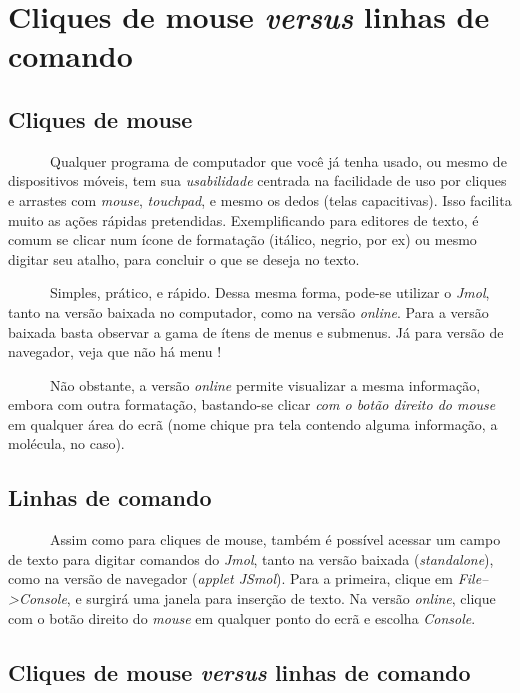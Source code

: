 \documentclass[
  letterpaper,
  DIV=11,
  numbers=noendperiod]{scrreprt}
\begin{document}

\chapter{\texorpdfstring{Cliques de mouse \emph{versus} linhas de
comando}{Cliques de mouse versus linhas de comando}}\label{cliques-de-mouse-versus-linhas-de-comando}

\section{Cliques de mouse}\label{cliques-de-mouse}

~~~~~~Qualquer programa de computador que você já tenha usado, ou mesmo
de dispositivos móveis, tem sua \emph{usabilidade} centrada na
facilidade de uso por cliques e arrastes com \emph{mouse},
\emph{touchpad}, e mesmo os dedos (telas capacitivas). Isso facilita
muito as ações rápidas pretendidas. Exemplificando para editores de
texto, é comum se clicar num ícone de formatação (itálico, negrio, por
ex) ou mesmo digitar seu atalho, para concluir o que se deseja no texto.

~~~~~~Simples, prático, e rápido. Dessa mesma forma, pode-se utilizar o
\emph{Jmol}, tanto na versão baixada no computador, como na versão
\emph{online}. Para a versão baixada basta observar a gama de ítens de
menus e submenus. Já para versão de navegador, veja que não há menu !

~~~~~~Não obstante, a versão \emph{online} permite visualizar a mesma
informação, embora com outra formatação, bastando-se clicar \emph{com o
botão direito do mouse} em qualquer área do ecrã (nome chique pra tela
contendo alguma informação, a molécula, no caso).

\section{Linhas de comando}\label{sec-linhasComando}

~~~~~~Assim como para cliques de mouse, também é possível acessar um
campo de texto para digitar comandos do \emph{Jmol}, tanto na versão
baixada (\emph{standalone}), como na versão de navegador (\emph{applet
JSmol}). Para a primeira, clique em \emph{File--\textgreater Console}, e
surgirá uma janela para inserção de texto. Na versão \emph{online},
clique com o botão direito do \emph{mouse} em qualquer ponto do ecrã e
escolha \emph{Console}.

\section{\texorpdfstring{Cliques de mouse \emph{versus} linhas de
comando}{Cliques de mouse versus linhas de comando}}\label{cliques-de-mouse-versus-linhas-de-comando-1}
\end{document}
